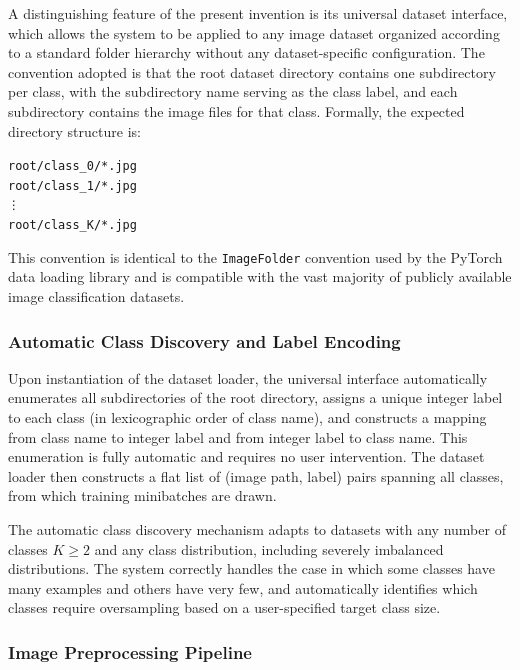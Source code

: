 \documentclass[12pt,letterpaper]{article}
\begin{document}
A distinguishing feature of the present invention is its universal dataset
interface, which allows the system to be applied to any image dataset organized
according to a standard folder hierarchy without any dataset-specific
configuration. The convention adopted is that the root dataset directory
contains one subdirectory per class, with the subdirectory name serving as the
class label, and each subdirectory contains the image files for that class.
Formally, the expected directory structure is:

\begin{center}
  \texttt{root/class\_0/*.jpg}\\
  \texttt{root/class\_1/*.jpg}\\
  \texttt{\quad \vdots}\\
  \texttt{root/class\_K/*.jpg}
\end{center}

This convention is identical to the \texttt{ImageFolder} convention used by the
PyTorch data loading library and is compatible with the vast majority of
publicly available image classification datasets.

\subsubsection{Automatic Class Discovery and Label Encoding}

Upon instantiation of the dataset loader, the universal interface automatically
enumerates all subdirectories of the root directory, assigns a unique integer
label to each class (in lexicographic order of class name), and constructs a
mapping from class name to integer label and from integer label to class name.
This enumeration is fully automatic and requires no user intervention. The
dataset loader then constructs a flat list of (image path, label) pairs spanning
all classes, from which training minibatches are drawn.

The automatic class discovery mechanism adapts to datasets with any number of
classes $K \geq 2$ and any class distribution, including severely imbalanced
distributions. The system correctly handles the case in which some classes have
many examples and others have very few, and automatically identifies which
classes require oversampling based on a user-specified target class size.

\subsubsection{Image Preprocessing Pipeline}
\end{document}
